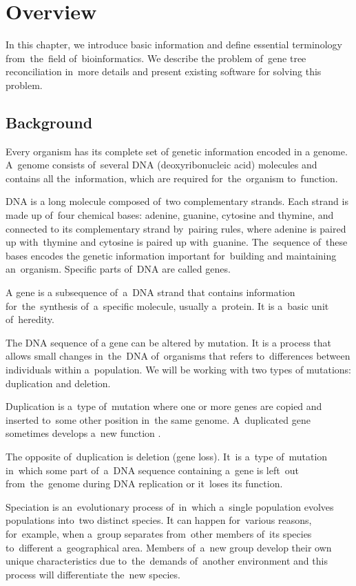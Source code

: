 \chapter{Overview}
In this chapter, we introduce basic information and define essential terminology from~the~field of~bioinformatics. We describe the problem of~gene tree reconciliation in~more details and present existing software for solving this problem.

\section{Background}
Every organism has its complete set of genetic information encoded in a genome. A~genome consists of~several DNA (deoxyribonucleic acid) molecules and contains all the~information, which are required for~the~organism to~function.

DNA is a long molecule composed of~two complementary strands. Each strand is made up of~four chemical bases: adenine, guanine, cytosine and thymine, and connected to its complementary strand by~pairing rules, where adenine is paired up with~thymine and cytosine is paired up with~guanine. The~sequence of~these bases encodes the genetic information important for~building and maintaining an~organism. Specific parts of~DNA are called genes.

A gene is a subsequence of~a~DNA strand that contains information for~the~synthesis of~a~specific molecule, usually a~protein. It is a~basic unit of~heredity.

The DNA sequence of a gene can be altered by mutation. It is a process that allows small changes in~the~DNA of~organisms that refers to~differences between individuals within a~population. We will be working with two types of mutations: duplication and deletion.

Duplication is a~type of~mutation where one or more genes are copied and inserted to~some other position in~the same genome. A~duplicated gene sometimes develops a~new function \cite{doyon}. 

The opposite of~duplication is deletion (gene loss). It~is a~type of~mutation in~which some part of~a~DNA sequence containing a~gene is left~out from~the~genome during DNA replication or it~loses its function. 

Speciation is an~evolutionary process of~in~which a~single population evolves populations into~two distinct species. It can happen for~various reasons, for~example, when a~group separates from~other members of~its species to~different a~geographical area. Members of~a~new group develop their own unique characteristics due to~the~demands of~another environment and this process will differentiate the~new species.

